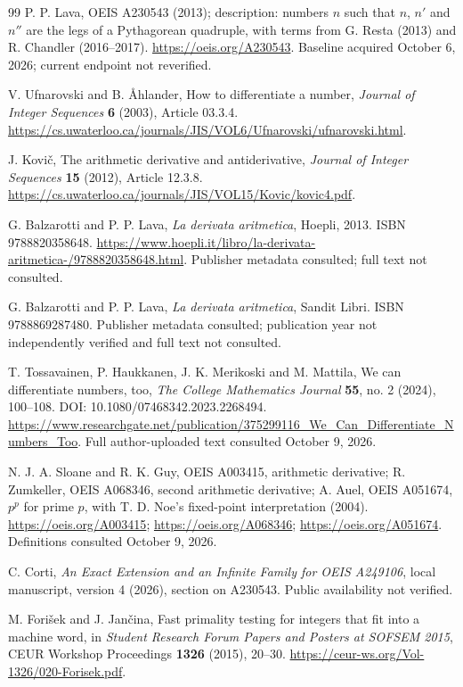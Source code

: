 \documentclass[11pt]{article}
\theoremstyle{definition}
\begin{document}
\begingroup
\raggedright
\clearpage
\begin{thebibliography}{99}
P. P. Lava, OEIS A230543 (2013); description: numbers $n$ such that
$n$, $n'$ and $n''$ are the legs of a Pythagorean quadruple, with terms from G. Resta
(2013) and R. Chandler (2016--2017).
\url{https://oeis.org/A230543}.
Baseline acquired October 6, 2026; current endpoint not reverified.

V. Ufnarovski and B. \AA hlander, How to differentiate a number,
\emph{Journal of Integer Sequences} \textbf{6} (2003), Article 03.3.4.
\url{https://cs.uwaterloo.ca/journals/JIS/VOL6/Ufnarovski/ufnarovski.html}.

J. Kovi\v{c}, The arithmetic derivative and antiderivative,
\emph{Journal of Integer Sequences} \textbf{15} (2012), Article 12.3.8.
\url{https://cs.uwaterloo.ca/journals/JIS/VOL15/Kovic/kovic4.pdf}.

G. Balzarotti and P. P. Lava, \emph{La derivata aritmetica}, Hoepli,
2013. ISBN 9788820358648.
\url{https://www.hoepli.it/libro/la-derivata-aritmetica-/9788820358648.html}.
Publisher metadata consulted; full text not consulted.

G. Balzarotti and P. P. Lava, \emph{La derivata aritmetica}, Sandit Libri.
ISBN 9788869287480. Publisher metadata consulted; publication year
not independently verified and full text not consulted.

T. Tossavainen, P. Haukkanen, J. K. Merikoski and M. Mattila,
We can differentiate numbers, too,
\emph{The College Mathematics Journal} \textbf{55}, no. 2 (2024), 100--108.
DOI: 10.1080/07468342.2023.2268494.
\url{https://www.researchgate.net/publication/375299116_We_Can_Differentiate_Numbers_Too}.
Full author-uploaded text consulted October 9, 2026.

N. J. A. Sloane and R. K. Guy, OEIS A003415, arithmetic derivative;
R. Zumkeller, OEIS A068346, second arithmetic derivative;
A. Auel, OEIS A051674, $p^p$ for prime $p$, with T. D. Noe's
fixed-point interpretation (2004).
\url{https://oeis.org/A003415}; \url{https://oeis.org/A068346};
\url{https://oeis.org/A051674}. Definitions consulted October 9, 2026.

C. Corti, \emph{An Exact Extension and an Infinite Family for OEIS A249106},
local manuscript, version 4 (2026), section on A230543.
Public availability not verified.

M. Fori\v{s}ek and J. Jan\v{c}ina, Fast primality testing for integers that
fit into a machine word, in \emph{Student Research Forum Papers and
Posters at SOFSEM 2015}, CEUR Workshop Proceedings \textbf{1326}
(2015), 20--30.
\url{https://ceur-ws.org/Vol-1326/020-Forisek.pdf}.


\end{thebibliography}
\end{document}
